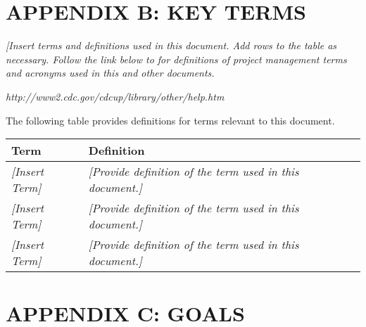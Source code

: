 \documentclass[a4paper, 11pt]{article}
\newcommand{\ra}[1]{\renewcommand{\arraystretch}{#1}}
\begin{document}
\newpage


\section{APPENDIX B: KEY TERMS}

\emph{{[}Insert terms and definitions used in this document. Add rows to
the table as necessary. Follow the link below to for definitions of
project management terms and acronyms used in this and other documents.}

\emph{http://www2.cdc.gov/cdcup/library/other/help.htm}

The following table provides definitions for terms relevant to this
document.

\ra{1.3}
\begin{longtable}[]{@{}ll@{}}
  \toprule
  \textbf{Term} & \textbf{Definition}\tabularnewline
  \midrule
  \endhead
  \emph{{[}Insert Term{]}} & \emph{{[}Provide definition of the term used
  in this document.{]}}\tabularnewline
  \emph{{[}Insert Term{]}} & \emph{{[}Provide definition of the term used
  in this document.{]}}\tabularnewline
  \emph{{[}Insert Term{]}} & \emph{{[}Provide definition of the term used
  in this document.{]}}\tabularnewline
  \bottomrule
\end{longtable}

\newpage


\section{APPENDIX C: GOALS}
\end{document}
